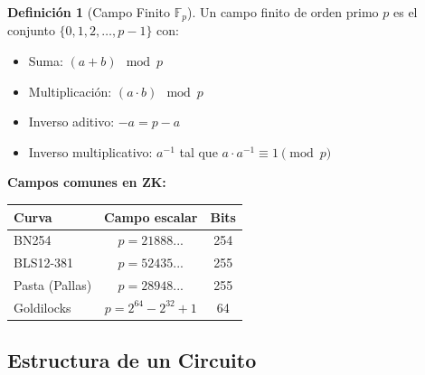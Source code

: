 \documentclass[11pt,a4paper,twoside,openright]{book}
\theoremstyle{definition}
\newtheorem{definition}{Definición}[chapter]
\theoremstyle{plain}
\theoremstyle{remark}
\begin{document}
\begin{definition}[Campo Finito $\mathbb{F}_p$]
Un campo finito de orden primo $p$ es el conjunto $\{0, 1, 2, \ldots, p-1\}$ con:
\begin{itemize}
    \item Suma: $(a + b) \mod p$
    \item Multiplicación: $(a \cdot b) \mod p$
    \item Inverso aditivo: $-a = p - a$
    \item Inverso multiplicativo: $a^{-1}$ tal que $a \cdot a^{-1} \equiv 1 \pmod{p}$
\end{itemize}

\textbf{Campos comunes en ZK:}
\begin{center}
\begin{tabular}{lcc}
\toprule
\textbf{Curva} & \textbf{Campo escalar} & \textbf{Bits} \\
\midrule
BN254 & $p = 21888...$ & 254 \\
BLS12-381 & $p = 52435...$ & 255 \\
Pasta (Pallas) & $p = 28948...$ & 255 \\
Goldilocks & $p = 2^{64} - 2^{32} + 1$ & 64 \\
\bottomrule
\end{tabular}
\end{center}
\end{definition}

\subsection{Estructura de un Circuito}
\end{document}
